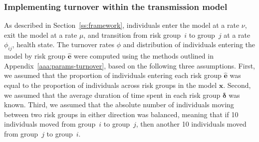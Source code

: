 \subsubsection{Implementing turnover within the transmission model}
\label{sss:turnover-implemented}
As described in Section~\ref{ss:framework}, individuals
enter the model at a rate $\nu$,
exit the model at a rate $\mu$,
and transition from risk group~$i$ to group~$j$ at a rate $\phi_{ij}$,
 health state.
The turnover rates $\phi$ and
distribution of individuals entering the model by risk group $\bm{\hat{e}}$
were computed using the methods outlined in
Appendix~\ref{aaa:params-turnover}, based on the following three assumptions.
First, we assumed that
the proportion of individuals entering each risk group $\bm{\hat{e}}$
was equal to the proportion of individuals across risk groups in the model $\bm{\hat{x}}$.
Second, we assumed that
the average duration of time spent in each risk group $\bm{\delta}$ was known.
Third, we assumed that the absolute number of individuals
moving between two risk groups in either direction was balanced,
meaning that if 10 individuals moved from group~$i$ to group~$j$,
then another 10 individuals moved from group~$j$ to group~$i$.
